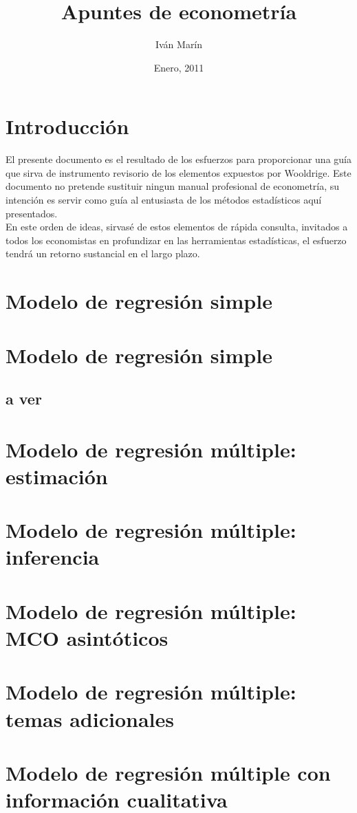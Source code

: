 \documentclass[a4paper,11pt]{book}
\begin{document}
\title{Apuntes de econometría}
\author{Iván Marín}
\date{Enero, 2011}
\maketitle
\chapter{Introducción}
El presente documento es el resultado de los esfuerzos para proporcionar una guía que sirva de instrumento revisorio de los elementos expuestos por Wooldrige. Este documento no pretende sustituir ningun manual profesional de econometría, su intención es servir como guía al entusiasta de los métodos estadísticos aquí presentados.\\

En este orden de ideas, sirvasé de estos elementos de rápida consulta, invitados a todos los economistas en profundizar en las herramientas estadísticas, el esfuerzo tendrá un retorno sustancial en el largo plazo.

\chapter{Modelo de regresión simple}
\chapter{Modelo de regresión simple}
\section{a ver}
\chapter{Modelo de regresión múltiple: estimación}
\chapter{Modelo de regresión múltiple: inferencia}
\chapter{Modelo de regresión múltiple: MCO asintóticos}
\chapter{Modelo de regresión múltiple: temas adicionales}
\chapter{Modelo de regresión múltiple con información cualitativa}
\end{document}
